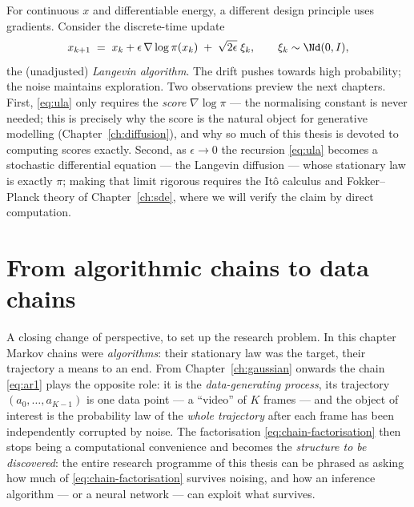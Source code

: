 For continuous $x$ and differentiable energy, a different design principle
uses gradients. Consider the discrete-time update
\begin{equation}
  x_{k+1} \;=\; x_k + \epsilon\, \nabla \log \pi(x_k)
  \;+\; \sqrt{2\epsilon}\; \xi_k ,
  \qquad \xi_k \sim \Nd(0, I),
  \label{eq:ula}
\end{equation}
the (unadjusted) \emph{Langevin algorithm}. The drift pushes towards high
probability; the noise maintains exploration. Two observations preview the
next chapters. First, \eqref{eq:ula} only requires the \emph{score}
$\nabla \log \pi$ --- the normalising constant is never needed; this is
precisely why the score is the natural object for generative modelling
(Chapter~\ref{ch:diffusion}), and why so much of this thesis is devoted to
computing scores exactly. Second, as $\epsilon \to 0$ the recursion
\eqref{eq:ula} becomes a stochastic differential equation --- the Langevin
diffusion --- whose stationary law is exactly $\pi$; making that limit
rigorous requires the It\^o calculus and Fokker--Planck theory of
Chapter~\ref{ch:sde}, where we will verify the claim by direct computation.

\section{From algorithmic chains to data chains}

A closing change of perspective, to set up the research problem. In this
chapter Markov chains were \emph{algorithms}: their stationary law was the
target, their trajectory a means to an end. From Chapter~\ref{ch:gaussian}
onwards the chain \eqref{eq:ar1} plays the opposite role: it is the
\emph{data-generating process}, its trajectory $(a_0, \dots, a_{K-1})$ is one
data point --- a ``video'' of $K$ frames --- and the object of interest is
the probability law of the \emph{whole trajectory} after each frame has been
independently corrupted by noise. The factorisation
\eqref{eq:chain-factorisation} then stops being a computational convenience
and becomes the \emph{structure to be discovered}: the entire research
programme of this thesis can be phrased as asking how much of
\eqref{eq:chain-factorisation} survives noising, and how an inference
algorithm --- or a neural network --- can exploit what survives.
